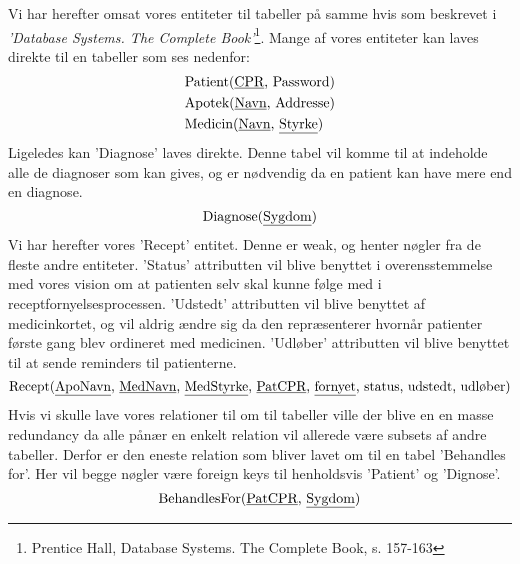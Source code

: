 Vi har herefter omsat vores entiteter til tabeller på samme hvis som beskrevet i \textit{'Database Systems. The Complete Book'}\footnote{Prentice Hall, Database Systems. The Complete Book, s. 157-163}. Mange af vores entiteter kan laves direkte til en tabeller som ses nedenfor:
\begin{align*}
	&\textrm{Patient}(\textrm{\underline{CPR}, Password})\\
	&\textrm{Apotek}(\textrm{\underline{Navn}, Addresse})\\
	&\textrm{Medicin}(\textrm{\underline{Navn}, \underline{Styrke}})\\
\end{align*}
Ligeledes kan 'Diagnose' laves direkte. Denne tabel vil komme til at indeholde alle de diagnoser som kan gives, og er nødvendig da en patient kan have mere end en diagnose.
\begin{equation*}
\textrm{Diagnose}(\textrm{\underline{Sygdom}})
\end{equation*}
Vi har herefter vores 'Recept' entitet. Denne er weak, og henter nøgler fra de fleste andre entiteter. 'Status' attributten vil blive benyttet i overensstemmelse med vores vision om at patienten selv skal kunne følge med i receptfornyelsesprocessen. 'Udstedt' attributten vil blive benyttet af medicinkortet, og vil aldrig ændre sig da den repræsenterer hvornår patienter første gang blev ordineret med medicinen. 'Udløber' attributten vil blive benyttet til at sende reminders til patienterne. 
\begin{equation*}
	\textrm{Recept}(\textrm{\underline{ApoNavn}, \underline{MedNavn}, \underline{MedStyrke}, \underline{PatCPR}, \underline{fornyet}, status, udstedt, udløber})
\end{equation*}
Hvis vi skulle lave vores relationer til om til tabeller ville der blive en en masse redundancy da alle pånær en enkelt relation vil allerede være subsets af andre tabeller. Derfor er den eneste relation som bliver lavet om til en tabel 'Behandles for'. Her vil begge nøgler være foreign keys til henholdsvis 'Patient' og 'Dignose'.
\begin{equation*}
\textrm{BehandlesFor}(\textrm{\underline{PatCPR}, \underline{Sygdom}})
\end{equation*}